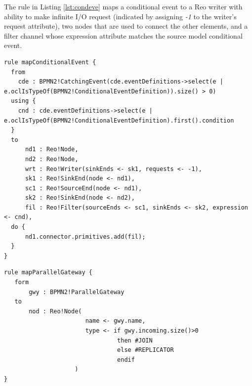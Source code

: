 The rule in Listing \ref{lst:condeve} maps a {conditional event} to a Reo {writer} with ability to make infinite I/O request (indicated by assigning \emph{-1} to the writer's {request} attribute), two nodes that are used to connect the other elements, and a {filter} channel whose {expression} attribute matches the source model {conditional event}.

\begin{lstlisting}[float,frame=single,caption=Mapping conditional event,label=lst:condeve]  
rule mapConditionalEvent {
  from
    cde : BPMN2!CatchingEvent(cde.eventDefinitions->select(e | e.oclIsTypeOf(BPMN2!ConditionalEventDefinition)).size() > 0)
  using {
    cnd : cde.eventDefinitions->select(e | e.oclIsTypeOf(BPMN2!ConditionalEventDefinition).first().condition
  }
  to
      nd1 : Reo!Node,
      nd2 : Reo!Node,
      wrt : Reo!Writer(sinkEnds <- sk1, requests <- -1),
      sk1 : Reo!SinkEnd(node <- nd1),
      sc1 : Reo!SourceEnd(node <- nd1),
      sk2 : Reo!SinkEnd(node <- nd2),
      fil : Reo!Filter(sourceEnds <- sc1, sinkEnds <- sk2, expression <- cnd),
  do {
      nd1.connector.primitives.add(fil);
  }          
}
\end{lstlisting}

\begin{lstlisting}[float,frame=single,caption=Mapping parallel  gateway,label=lst:gwpar]
rule mapParallelGateway {
   form
       gwy : BPMN2!ParallelGateway
   to
       nod : Reo!Node(
                       name <- gwy.name, 
                       type <- if gwy.incoming.size()>0 
                                then #JOIN 
                                else #REPLICATOR
                                endif
                    )
}
\end{lstlisting}

